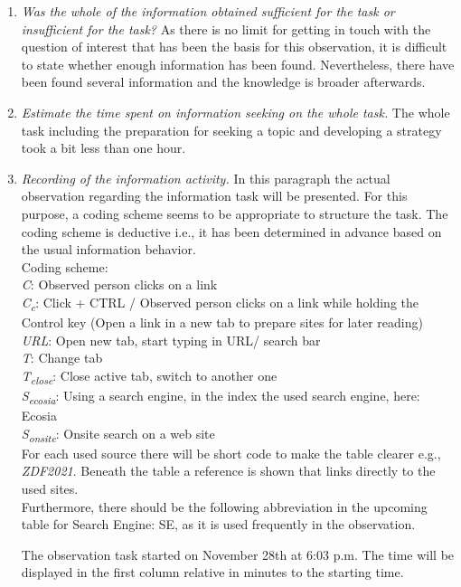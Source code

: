 \documentclass[11pt,letterpaper]{article}
\begin{document}
\begin{enumerate}
\item \textit{Was the whole of the information obtained sufficient for the task or insufficient for the task?} As there is no limit for getting in touch with the question of interest that has been the basis for this observation, it is difficult to state whether enough information has been found. Nevertheless, there have been found several information and the knowledge is broader afterwards.

\item \textit{Estimate the time spent on information seeking on the whole task.}
The whole task including the preparation for seeking a topic and developing a strategy took a bit less than one hour.

\item \textit{Recording of the information activity.}
In this paragraph the actual observation regarding the information task will be presented.
For this purpose, a coding scheme seems to be appropriate to structure the task. The coding scheme is deductive i.e., it has been determined in advance based on the usual information behavior.\\

Coding scheme: \\
\textit{C}: Observed person clicks on a link \\
\textit{C\textsubscript{c}}: Click + CTRL / Observed person clicks on a link while holding the Control key (Open a link in a new tab to prepare sites for later reading) \\
\textit{URL}: Open new tab, start typing in URL/ search bar \\
\textit{T}: Change tab \\
\textit{T\textsubscript{close}}: Close active tab, switch to another one \\
\textit{S\textsubscript{ecosia}}: Using a search engine, in the index the used search engine, here: Ecosia \\
\textit{S\textsubscript{onsite}}: Onsite search on a web site \\
For each used source there will be short code to make the table clearer e.g., \textit{ZDF2021}. Beneath the table a reference is shown that links directly to the used sites. \\

Furthermore, there should be the following abbreviation in the upcoming table for Search Engine: SE, as it is used frequently in the observation.

The observation task started on November 28th at 6:03 p.m. The time will be displayed in the first column relative in minutes to the starting time.


\end{enumerate}
\end{document}
